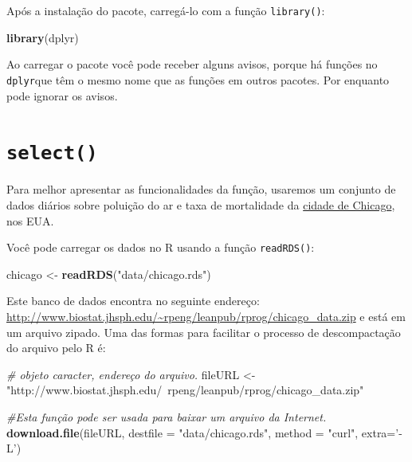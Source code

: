 \documentclass[]{book}
\newenvironment{Shaded}{\begin{snugshade}}{\end{snugshade}}
\newcommand{\CommentTok}[1]{\textcolor[rgb]{0.56,0.35,0.01}{\textit{#1}}}
\newcommand{\DataTypeTok}[1]{\textcolor[rgb]{0.13,0.29,0.53}{#1}}
\newcommand{\KeywordTok}[1]{\textcolor[rgb]{0.13,0.29,0.53}{\textbf{#1}}}
\newcommand{\NormalTok}[1]{#1}
\newcommand{\StringTok}[1]{\textcolor[rgb]{0.31,0.60,0.02}{#1}}
\begin{document}
Após a instalação do pacote, carregá-lo com a função \texttt{library()}:

\begin{Shaded}
\begin{Highlighting}[]
\KeywordTok{library}\NormalTok{(dplyr)}
\end{Highlighting}
\end{Shaded}

Ao carregar o pacote você pode receber alguns avisos, porque há funções no \texttt{dplyr}que têm o mesmo nome que as funções em outros pacotes. Por enquanto pode ignorar os avisos.

\hypertarget{select}{%
\section{\texorpdfstring{\texttt{select()}}{select()}}\label{select}}

Para melhor apresentar as funcionalidades da função, usaremos um conjunto de dados diários sobre poluição do ar e taxa de mortalidade da \href{http://www.biostat.jhsph.edu/~rpeng/leanpub/rprog/chicago_data.zip}{cidade de Chicago}, nos EUA.

Você pode carregar os dados no R usando a função \texttt{readRDS()}:

\begin{Shaded}
\begin{Highlighting}[]
\NormalTok{chicago <-}\StringTok{ }\KeywordTok{readRDS}\NormalTok{(}\StringTok{"data/chicago.rds"}\NormalTok{)}
\end{Highlighting}
\end{Shaded}

Este banco de dados encontra no seguinte endereço: \url{http://www.biostat.jhsph.edu/~rpeng/leanpub/rprog/chicago_data.zip} e está em um arquivo zipado. Uma das formas para facilitar o processo de descompactação do arquivo pelo R é:

\begin{Shaded}
\begin{Highlighting}[]
\CommentTok{# objeto caracter, endereço do arquivo.}
\NormalTok{fileURL <-}\StringTok{ "http://www.biostat.jhsph.edu/~rpeng/leanpub/rprog/chicago_data.zip"}

\CommentTok{#Esta função pode ser usada para baixar um arquivo da Internet.}
\KeywordTok{download.file}\NormalTok{(fileURL, }\DataTypeTok{destfile =} \StringTok{"data/chicago.rds"}\NormalTok{, }\DataTypeTok{method =} \StringTok{"curl"}\NormalTok{, }\DataTypeTok{extra=}\StringTok{'-L'}\NormalTok{) }
\end{Highlighting}
\end{Shaded}
\end{document}
